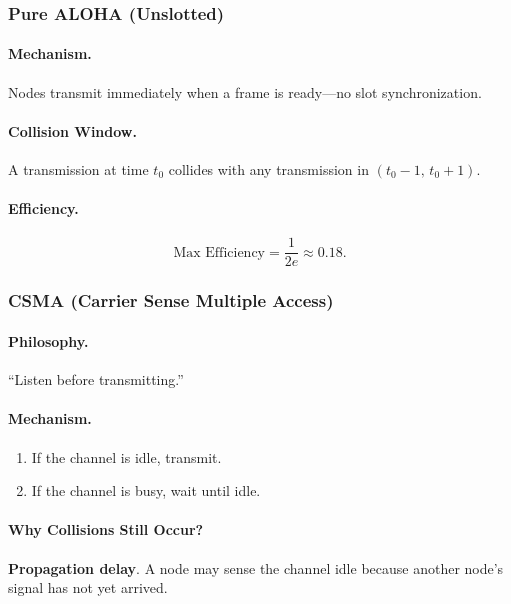 \documentclass[12pt]{article}
\begin{document}
\subsubsection{Pure ALOHA (Unslotted)}

\paragraph{Mechanism.}
Nodes transmit immediately when a frame is ready—no slot synchronization.

\paragraph{Collision Window.}
A transmission at time $t_0$ collides with any transmission in $(t_0 - 1,\, t_0 + 1)$.

\paragraph{Efficiency.}
\[
    \text{Max Efficiency} = \frac{1}{2e} \approx 0.18.
\]

\subsubsection{CSMA (Carrier Sense Multiple Access)}

\paragraph{Philosophy.}
``Listen before transmitting.''

\paragraph{Mechanism.}
\begin{enumerate}
    \item If the channel is idle, transmit.
    \item If the channel is busy, wait until idle.
\end{enumerate}

\paragraph{Why Collisions Still Occur?}
\textbf{Propagation delay}.
A node may sense the channel idle because another node’s signal has not yet arrived.

\end{document}
